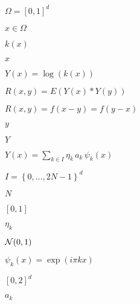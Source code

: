 \documentclass{article}
\begin{document}
$ \Omega = [0,1]^d $
\pagebreak

$ x \in \Omega $
\pagebreak

$ k(x) $
\pagebreak

$ x $
\pagebreak

$ Y(x) = \log(k(x)) $
\pagebreak

$ R(x,y) = E(Y(x)*Y(y)) $
\pagebreak

$ R(x,y) = f(x-y) = f(y-x) $
\pagebreak

$ y $
\pagebreak

$ Y $
\pagebreak

$ Y(x) = \sum\limits_{k\in I} \eta_k \, a_k \, \psi_k(x) $
\pagebreak

$ I = \left\{ 0,\ldots,2N-1 \right\}^d $
\pagebreak

$ N $
\pagebreak

$ [0,1] $
\pagebreak

$ \eta_k $
\pagebreak

$ {\cal N}(0,1) $
\pagebreak

$ \psi_k(x) = \exp( i \pi k x ) $
\pagebreak

$ [0,2]^d $
\pagebreak

$ a_k $
\pagebreak
\end{document}
